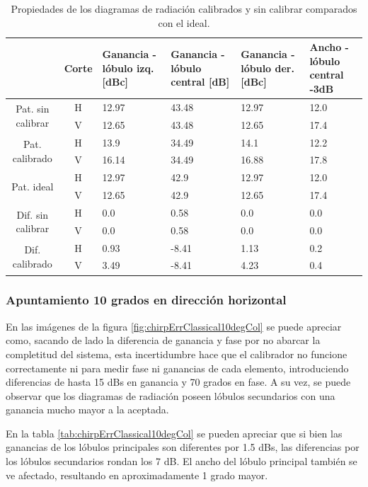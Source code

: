 \begin{table}[H]
  \footnotesize
  \centering
  \begin{tabular}{|c|c|p{2cm}|p{2.5cm}|p{2.5cm}|p{2.5cm}|}
    \cline{2-6}
    \multicolumn{1}{c|}{} & Corte & Ganancia - lóbulo izq. [dBc] & Ganancia - lóbulo central [dB] &
    Ganancia - lóbulo der. [dBc] & Ancho - lóbulo central -3dB \tabularnewline\hline
    \multirow{2}{2cm}{Pat. sin calibrar} & H & 12.97 & 43.48 & 12.97 & 12.0 \tabularnewline\cline{2-6}
     & V & 12.65 & 43.48 & 12.65 & 17.4 \tabularnewline\hline
    \multirow{2}{2cm}{Pat. calibrado} & H & 13.9 & 34.49 & 14.1 & 12.2 \tabularnewline\cline{2-6}
     & V & 16.14 & 34.49 & 16.88 & 17.8 \tabularnewline\hline
    \multirow{2}{2cm}{Pat. ideal} & H & 12.97 & 42.9 & 12.97 & 12.0 \tabularnewline\cline{2-6}
     & V & 12.65 & 42.9 & 12.65 & 17.4 \tabularnewline\hline
    \multirow{2}{2cm}{Dif. sin calibrar} & H & 0.0 & 0.58 & 0.0 & 0.0\tabularnewline\cline{2-6}
     & V & 0.0 & 0.58 & 0.0 & 0.0 \tabularnewline\hline
    \multirow{2}{2cm}{Dif. calibrado} & H & 0.93 & -8.41 & 1.13 & 0.2 \tabularnewline\cline{2-6}
     & V & 3.49 & -8.41 & 4.23 & 0.4 \tabularnewline\hline
  \end{tabular}
  \caption{Propiedades de los diagramas de radiación calibrados y sin calibrar comparados con el ideal.}
  \label{tab:chirpErrClassical0deg}
\end{table}


\subsubsection{Apuntamiento 10 grados en dirección horizontal}

En las imágenes de la figura \ref{fig:chirpErrClassical10degCol} se puede apreciar como, sacando de lado la diferencia de 
ganancia y fase por no abarcar la completitud del sistema, esta incertidumbre hace que el calibrador no funcione correctamente 
ni para medir fase ni ganancias de cada elemento, introduciendo diferencias de hasta 15 dBs en ganancia y 70 grados en fase. 
A su vez, se puede observar que los diagramas de radiación poseen lóbulos secundarios con una ganancia mucho mayor a la aceptada.

En la tabla \ref{tab:chirpErrClassical10degCol} se pueden apreciar que si bien las ganancias de los lóbulos principales son 
diferentes por 1.5 dBs, las diferencias por los lóbulos secundarios rondan los 7 dB. El ancho del lóbulo principal también 
se ve afectado, resultando en aproximadamente 1 grado mayor.


